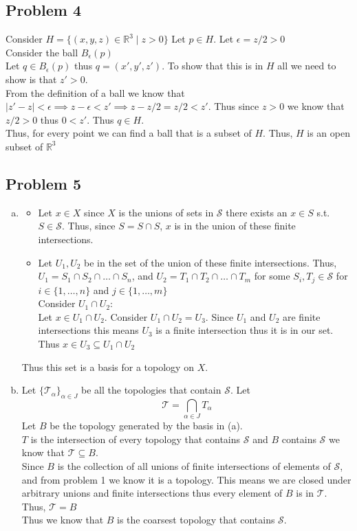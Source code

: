 \documentclass[12pt, letterpaper]{article}
\theoremstyle{definition}
\newcommand{\R}{\mathbb{R}}
\newcommand{\T}{\mathcal{T}}
\begin{document}
\newpage
\subsection*{Problem 4}
Consider $H=\{(x,y,z) \in \R^3 \mid z >0\}$
Let $p \in H$. Let $\epsilon = z/2 > 0$\\
Consider the ball $B_\epsilon(p)$\\
Let $q \in B_\epsilon(p)$ thus $q=(x',y',z')$. To show that this is in $H$ all we need to show is that $z' >0$.\\
From the definition of a ball we know that $|z'-z| < \epsilon \implies z-\epsilon < z' \implies z-z/2=z/2 < z'$. Thus since $z>0$ we know that $z/2 > 0$ thus $0 < z'$. Thus $q \in H$.\\
Thus, for every point we can find a ball that is a subset of $H$. Thus, $H$ is an open subset of $\R^3$

\newpage
\subsection*{Problem 5}
\begin{enumerate}[(a)]
    \item \begin{itemize}
        \item Let $x \in X$ since $X$ is the unions of sets in $\mathcal{S}$ there exists an $x \in S$ s.t. $S \in \mathcal{S}$. Thus, since $S=S \cap S$, $x$ is in the union of these finite intersections.
        \item Let $U_1,U_2$ be in the set of the union of these finite intersections. Thus, $U_1 = S_1 \cap S_2 \cap \dots \cap S_n$, and $U_2 = T_1 \cap T_2 \cap \dots \cap T_m$ for some $S_i,T_j \in \mathcal{S}$ for $i \in \{1,\dots,n\}$ and $j \in \{1,\dots,m\}$\\
        Consider $U_1 \cap U_2$:\\
        Let $x \in U_1 \cap U_2$. Consider $U_1 \cap U_2 = U_3$. Since $U_1$ and $U_2$ are finite intersections this means $U_3$ is a finite intersection thus it is in our set. Thus $x \in U_3 \subseteq U_1 \cap U_2$
    \end{itemize}
    Thus this set is a basis for a topology on $X$.
    \item Let $\{\T_\alpha\}_{\alpha \in J}$ be all the topologies that contain $\mathcal{S}$. Let\\
    \[\T = \bigcap_{\alpha \in J}T_\alpha\]
    Let $B$ be the topology generated by the basis in (a).\\
    $T$ is the intersection of every topology that contains $\mathcal{S}$ and $B$ contains $\mathcal{S}$ we know that $\T \subseteq B$.\\
    Since $B$ is the collection of all unions of finite intersections of elements of $\mathcal{S}$, and from problem 1 we know it is a topology. This means we are closed under arbitrary unions and finite intersections thus every element of $B$ is in $\T$.\\
    Thus, $\T = B$\\
    Thus we know that $B$ is the coarsest topology that contains $\mathcal{S}$.
\end{enumerate}
\end{document}

